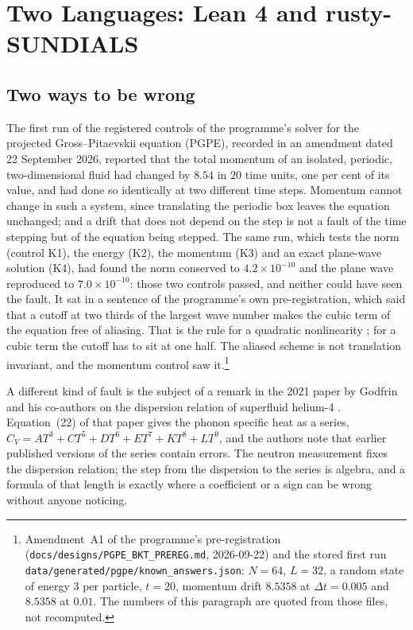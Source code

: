 \chapter{Two Languages: Lean 4 and rusty-SUNDIALS}\label{ch02}

\section{Two ways to be wrong}\label{ch02:wrong}

The first run of the registered controls of the programme's solver for the projected Gross--Pitaevskii equation (PGPE), recorded in an amendment dated 22 September 2026, reported that the
total momentum of an isolated, periodic, two-dimensional fluid had changed by $8.54$ in $20$ time units, one per cent of its value, and had done so identically at two
different time steps. Momentum cannot change in such a system, since translating the periodic box leaves the equation unchanged; and a drift that does not depend on the step is not a
fault of the time stepping but of the equation being stepped. The same run, which tests the norm (control K1), the energy (K2), the momentum (K3) and an exact plane-wave solution (K4),
had found the norm conserved to $4.2\times10^{-10}$ and the plane wave reproduced to $7.0\times10^{-10}$: those two controls passed, and neither could have seen the fault. It sat in a sentence of the
programme's own pre-registration, which said that a cutoff at two thirds of the largest wave number makes the cubic term of the equation free of aliasing. That is the rule for a quadratic
nonlinearity \cite{Orszag1971}; for a cubic term the cutoff has to sit at one half. The aliased scheme is not translation invariant, and the momentum control saw it.\footnote{Amendment~A1 of the programme's pre-registration
(\texttt{docs/designs/PGPE\_BKT\_PREREG.md}, 2026-09-22) and the stored first run \texttt{data/generated/pgpe/known\_answers.json}: $N=64$, $L=32$, a random state of energy $3$ per particle,
$t=20$, momentum drift $8.5358$ at $\Delta t=0.005$ and $8.5358$ at $0.01$. The numbers of this paragraph are quoted from those files, not recomputed.}

A different kind of fault is the subject of a remark in the 2021 paper by Godfrin and his co-authors on the dispersion relation of superfluid
helium-4 \cite{Godfrin2021}. Equation~(22) of that paper gives the phonon specific heat as a series,
$C_V=AT^3+CT^5+DT^6+ET^7+KT^8+LT^9$, and the authors note that earlier published versions of the series contain errors.
The neutron measurement fixes the dispersion relation; the step from the dispersion to the series is algebra, and a formula of that length is
exactly where a coefficient or a sign can be wrong without anyone noticing.

